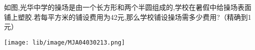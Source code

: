 如图,光华中学的操场是由一个长方形和两个半圆组成的,学校在暑假中给操场表面铺上塑胶.若每平方米的铺设费用为42元,那么学校铺设操场需多少费用?（精确到1元）

\begin{flushright}

    \texttt{[image: lib/image/MJA04030213.png]}

\end{flushright}



